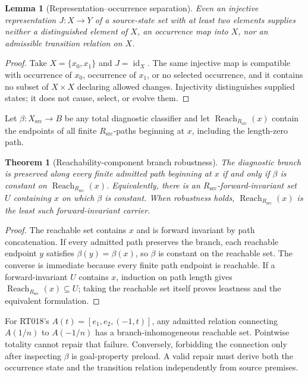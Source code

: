 \documentclass[11pt]{article}
\newtheorem{theorem}{Theorem}
\newtheorem{lemma}{Lemma}
\newcommand{\Xsrc}{X_{\mathrm{src}}}
\newcommand{\Rsrc}{R_{\mathrm{src}}}
\begin{document}
\begin{lemma}[Representation--occurrence separation]
Even an injective representation $J:X\to Y$ of a source-state set with at
least two elements supplies neither a distinguished element of $X$, an
occurrence map into $X$, nor an admissible transition relation on $X$.
\end{lemma}

\begin{proof}
Take $X=\{x_0,x_1\}$ and $J=\operatorname{id}_X$.  The same injective map is
compatible with occurrence of $x_0$, occurrence of $x_1$, or no selected
occurrence, and it contains no subset of $X\times X$ declaring allowed
changes.  Injectivity distinguishes supplied states; it does not cause,
select, or evolve them.
\end{proof}

Let $\beta:\Xsrc\to B$ be any total diagnostic classifier and let
$\operatorname{Reach}_{\Rsrc}(x)$ contain the endpoints of all finite
$\Rsrc$-paths beginning at $x$, including the length-zero path.

\begin{theorem}[Reachability-component branch robustness]
The diagnostic branch is preserved along every finite admitted path beginning
at $x$ if and only if $\beta$ is constant on
$\operatorname{Reach}_{\Rsrc}(x)$.  Equivalently, there is an
$\Rsrc$-forward-invariant set $U$ containing $x$ on which $\beta$ is
constant.  When robustness holds,
$\operatorname{Reach}_{\Rsrc}(x)$ is the least such forward-invariant carrier.
\end{theorem}

\begin{proof}
The reachable set contains $x$ and is forward invariant by path
concatenation.  If every admitted path preserves the branch, each reachable
endpoint $y$ satisfies $\beta(y)=\beta(x)$, so $\beta$ is constant on the
reachable set.  The converse is immediate because every finite path endpoint
is reachable.  If a forward-invariant $U$ contains $x$, induction on path
length gives $\operatorname{Reach}_{\Rsrc}(x)\subseteq U$; taking the reachable
set itself proves leastness and the equivalent formulation.
\end{proof}

For RT018's $A(t)=[e_1,e_2,(-1,t)]$, any admitted relation connecting
$A(1/n)$ to $A(-1/n)$ has a branch-inhomogeneous reachable set.  Pointwise
totality cannot repair that failure.  Conversely, forbidding the connection
only after inspecting $\beta$ is goal-property preload.  A valid repair must
derive both the occurrence state and the transition relation independently
from source premises.
\end{document}
